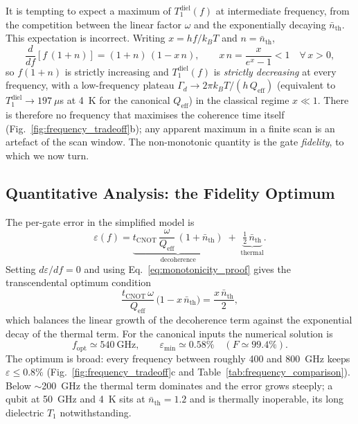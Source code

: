 It is tempting to expect a maximum of $T_1^{\text{diel}}(f)$ at intermediate
frequency, from the competition between the linear factor $\omega$ and the
exponentially decaying $\bar{n}_{\text{th}}$. This expectation is incorrect.
Writing $x = hf/k_BT$ and $n = \bar{n}_{\text{th}}$,
\begin{equation}
\frac{d}{df}\!\left[f\,(1+n)\right] = (1+n)\,(1 - x\,n),
\qquad
x\,n = \frac{x}{e^{x}-1} < 1 \quad \forall\, x > 0,
\label{eq:monotonicity_proof}
\end{equation}
so $f(1+n)$ is strictly increasing and $T_1^{\text{diel}}(f)$ is
\emph{strictly decreasing} at every frequency, with a low-frequency plateau
$\Gamma_d \to 2\pi k_B T/(h\,Q_{\text{eff}})$ (equivalent to
$T_1^{\text{diel}} \to 197~\mu$s at \SI{4}{\kelvin} for the canonical
$Q_{\text{eff}}$) in the classical regime $x \ll 1$. There is therefore no
frequency that maximises the coherence time itself
(Fig.~\ref{fig:frequency_tradeoff}b); any apparent maximum in a finite scan is
an artefact of the scan window. The non-monotonic quantity is the gate
\emph{fidelity}, to which we now turn.

\subsection{Quantitative Analysis: the Fidelity Optimum}

The per-gate error in the simplified model is
\begin{equation}
\varepsilon(f)
= \underbrace{t_{\text{CNOT}}\,\frac{\omega}{Q_{\text{eff}}}\,(1+\bar{n}_{\text{th}})}_{\text{decoherence}}
\;+\; \underbrace{\tfrac{1}{2}\,\bar{n}_{\text{th}}}_{\text{thermal}} .
\label{eq:eps_frequency_model}
\end{equation}
Setting $d\varepsilon/df = 0$ and using
Eq.~\eqref{eq:monotonicity_proof} gives the transcendental optimum condition
\begin{equation}
\frac{t_{\text{CNOT}}\,\omega}{Q_{\text{eff}}}\,\bigl(1 - x\,\bar{n}_{\text{th}}\bigr)
= \frac{x\,\bar{n}_{\text{th}}}{2} ,
\label{eq:optimal_frequency_condition}
\end{equation}
which balances the linear growth of the decoherence term against the
exponential decay of the thermal term. For the canonical inputs the numerical
solution is
\begin{equation}
f_{\text{opt}} \simeq \SI{540}{\giga\hertz},
\qquad
\varepsilon_{\min} \simeq 0.58\%
\quad (F \simeq 99.4\%).
\end{equation}
The optimum is broad: every frequency between roughly \SI{400}{} and
\SI{800}{\giga\hertz} keeps $\varepsilon \leq 0.8\%$
(Fig.~\ref{fig:frequency_tradeoff}c and
Table~\ref{tab:frequency_comparison}). Below $\sim$\SI{200}{\giga\hertz} the
thermal term dominates and the error grows steeply; a qubit at
\SI{50}{\giga\hertz} and \SI{4}{\kelvin} sits at $\bar{n}_{\text{th}} = 1.2$
and is thermally inoperable, its long dielectric $T_1$ notwithstanding.

